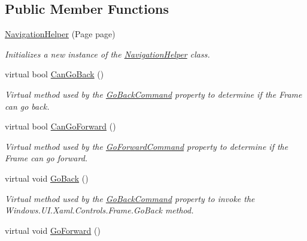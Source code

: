 \subsection*{Public Member Functions}
\begin{DoxyCompactItemize}
\item 
\hyperlink{class__1aarsproeve_1_1_common_1_1_navigation_helper_af14c5526e239fb66aa413b026b555cdb}{Navigation\+Helper} (Page page)
\begin{DoxyCompactList}\small\item\em Initializes a new instance of the \hyperlink{class__1aarsproeve_1_1_common_1_1_navigation_helper}{Navigation\+Helper} class. \end{DoxyCompactList}\item 
virtual bool \hyperlink{class__1aarsproeve_1_1_common_1_1_navigation_helper_a6022d2d426e7213d412325d1b9fc05ed}{Can\+Go\+Back} ()
\begin{DoxyCompactList}\small\item\em Virtual method used by the \hyperlink{class__1aarsproeve_1_1_common_1_1_navigation_helper_a4f5f9df95a5c10434b08d04da50a2467}{Go\+Back\+Command} property to determine if the Frame can go back. \end{DoxyCompactList}\item 
virtual bool \hyperlink{class__1aarsproeve_1_1_common_1_1_navigation_helper_aaa3cbdb865a20d782eff8cd283bb8e0b}{Can\+Go\+Forward} ()
\begin{DoxyCompactList}\small\item\em Virtual method used by the \hyperlink{class__1aarsproeve_1_1_common_1_1_navigation_helper_a9bb68ebbefcf2daaeaf8f18775eb8a80}{Go\+Forward\+Command} property to determine if the Frame can go forward. \end{DoxyCompactList}\item 
virtual void \hyperlink{class__1aarsproeve_1_1_common_1_1_navigation_helper_ac31589f6f0725544c6d6f8c409816a9c}{Go\+Back} ()
\begin{DoxyCompactList}\small\item\em Virtual method used by the \hyperlink{class__1aarsproeve_1_1_common_1_1_navigation_helper_a4f5f9df95a5c10434b08d04da50a2467}{Go\+Back\+Command} property to invoke the Windows.\+U\+I.\+Xaml.\+Controls.\+Frame.\+Go\+Back method. \end{DoxyCompactList}\item 
virtual void \hyperlink{class__1aarsproeve_1_1_common_1_1_navigation_helper_a56206b1bac5776daee0f5c79e26d4845}{Go\+Forward} ()

\end{DoxyCompactItemize}
